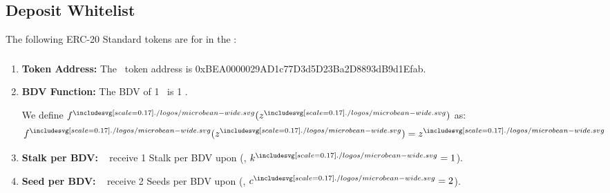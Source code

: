 \documentclass[class=article, crop=false]{standalone}
\begin{document}
\subsection{Deposit Whitelist}
The following ERC-20 Standard tokens are  for  in the :
\subsubsection{\Bean}
    \begin{enumerate}
        \item \textbf{Token Address:} The \Bean\ token address is 0xBEA0000029AD1c77D3d5D23Ba2D8893dB9d1Efab.
        \item \textbf{BDV Function:} The BDV of 1 \Bean\ is 1 \Bean. 

We define $f^{\bean}(z^{\bean})$ as:
$$f^{\bean}(z^{\bean}) = z^{\bean}$$
        \item \textbf{Stalk per BDV:} \Bean\  receive 1 Stalk per BDV upon  (, $k^{\bean} = 1$).
        \item \textbf{Seed per BDV:} \Bean\  receive 2 Seeds per BDV upon  (, $c^{\bean} = 2$).
    \end{enumerate}
\end{document}
